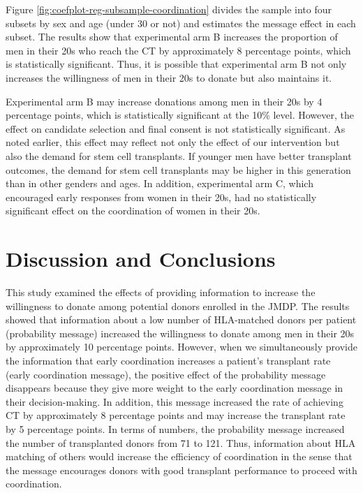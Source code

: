 \documentclass[12pt, a4paper]{article}
\begin{document}
Figure \ref{fig:coefplot-reg-subsample-coordination} divides the sample into four subsets by sex and age (under 30 or not) and estimates the message effect in each subset. The results show that experimental arm B increases the proportion of men in their 20s who reach the CT by approximately 8 percentage points, which is statistically significant. Thus, it is possible that experimental arm B not only increases the willingness of men in their 20s to donate but also maintains it.

Experimental arm B may increase donations among men in their 20s by 4 percentage points, which is statistically significant at the 10\% level. However, the effect on candidate selection and final consent is not statistically significant. As noted earlier, this effect may reflect not only the effect of our intervention but also the demand for stem cell transplants. If younger men have better transplant outcomes, the demand for stem cell transplants may be higher in this generation than in other genders and ages. In addition, experimental arm C, which encouraged early responses from women in their 20s, had no statistically significant effect on the coordination of women in their 20s.

\hypertarget{conclusion}{%
\section{Discussion and Conclusions}\label{conclusion}}

This study examined the effects of providing information to increase the willingness to donate among potential donors enrolled in the JMDP. The results showed that information about a low number of HLA-matched donors per patient (probability message) increased the willingness to donate among men in their 20s by approximately 10 percentage points. However, when we simultaneously provide the information that early coordination increases a patient's transplant rate (early coordination message), the positive effect of the probability message disappears because they give more weight to the early coordination message in their decision-making. In addition, this message increased the rate of achieving CT by approximately 8 percentage points and may increase the transplant rate by 5 percentage points. In terms of numbers, the probability message increased the number of transplanted donors from 71 to 121. Thus, information about HLA matching of others would increase the efficiency of coordination in the sense that the message encourages donors with good transplant performance to proceed with coordination.
\end{document}
